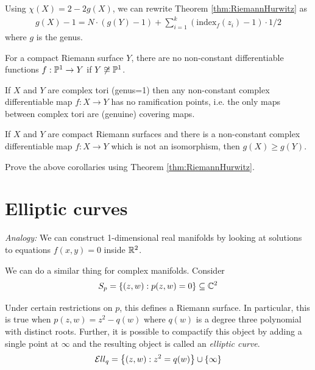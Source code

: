 \documentclass{article}
\begin{document}
Using $\chi(X) = 2 - 2g(X)$, we can rewrite Theorem \ref{thm:RiemannHurwitz} as
  \begin{align*}
    g(X) - 1 = N \cdot (g(Y) - 1) + \sum_{i = 1}^k \left(\mathrm{index}_f(z_i) - 1\right) \cdot 1/2
  \end{align*}
  where $g$ is the genus.




  \begin{corollary}
    For a compact Riemann surface $Y$, there are no non-constant differentiable functions $f: \mathbb{P}^1 \rightarrow Y$ if $Y \not \cong \mathbb{P}^1$.
  \end{corollary}




\begin{corollary}
  If $X$ and $Y$ are complex tori (genus=1) then any non-constant complex differentiable map $f:X \rightarrow Y$ has no ramification points, i.e. the only maps between complex tori are (genuine) covering maps.
\end{corollary}

\begin{corollary}
  If $X$ and $Y$ are compact Riemann surfaces and there is a non-constant complex differentiable map $f:X \rightarrow Y$ which is not an isomorphism, then $g(X) \ge g(Y)$.
\end{corollary}

\begin{qbox}
  Prove the above corollaries using Theorem \ref{thm:RiemannHurwitz}.
\end{qbox}










\section{Elliptic curves}
  \emph{Analogy:} We can construct 1-dimensional real manifolds by looking at solutions to equations $f(x,y) = 0$ inside $\mathbb{R}^2$.

  We can do a similar thing for complex manifolds.
  Consider
  \begin{align*}
    S_p = \left\{(z,w) : p(z,w) = 0\right\} \subseteq \mathbb{C}^2
  \end{align*}

  Under certain restrictions on $p$, this defines a Riemann surface. In particular, this is true when $p(z,w) = z^2 - q(w)$ where $q(w)$ is a degree three polynomial with distinct roots. Further, it is possible to compactify this object by adding a single point at $\infty$ and the resulting object is called an \emph{elliptic curve}.
  \begin{align*}
    \mathcal{E} ll_q = \left\{(z,w) : z^2 = q(w) \right\} \cup \left\{\infty\right\}
  \end{align*}
\end{document}
